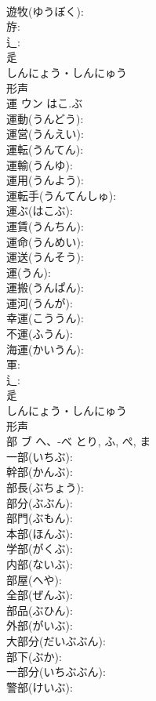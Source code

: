 \documentclass[8pt]{extreport}
\begin{document}
\begin{CJK}{UTF8}{min}
\\	遊牧(ゆうぼく): 
\\	斿: 
\\	辶: 
\\	辵	
\\	しんにょう・しんにゅう	
\\	形声 
\\	運	ウン	はこ.ぶ		
\\	運動(うんどう): 
\\	運営(うんえい): 
\\	運転(うんてん): 
\\	運輸(うんゆ): 
\\	運用(うんよう): 
\\	運転手(うんてんしゅ): 
\\	運ぶ(はこぶ): 
\\	運賃(うんちん): 
\\	運命(うんめい): 
\\	運送(うんそう): 
\\	運(うん): 
\\	運搬(うんぱん): 
\\	運河(うんが): 
\\	幸運(こううん): 
\\	不運(ふうん): 
\\	海運(かいうん): 
\\	軍: 
\\	辶: 
\\	辵	
\\	しんにょう・しんにゅう	
\\	形声 
\\	部	ブ	へ、-べ	とり, ふ, ぺ, ま	
\\	一部(いちぶ): 
\\	幹部(かんぶ): 
\\	部長(ぶちょう): 
\\	部分(ぶぶん): 
\\	部門(ぶもん): 
\\	本部(ほんぶ): 
\\	学部(がくぶ): 
\\	内部(ないぶ): 
\\	部屋(へや): 
\\	全部(ぜんぶ): 
\\	部品(ぶひん): 
\\	外部(がいぶ): 
\\	大部分(だいぶぶん): 
\\	部下(ぶか): 
\\	一部分(いちぶぶん): 
\\	警部(けいぶ): 

\end{CJK}
\end{document}
